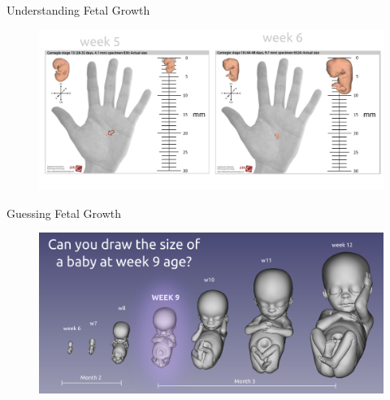 {
\begin{frame}{Understanding Fetal Growth}
      \begin{figure}
        \centering
        \includegraphics[width=1.0\textwidth]{./figures/fetal-size/versions/drawing-v01.png}
      \end{figure}
\end{frame}
}


{
\begin{frame}{Guessing Fetal Growth}
      \begin{figure}
        \centering
        \includegraphics[width=1.0\textwidth]{./figures/fetal-growth/versions/drawing-v02-v01}
      \end{figure}
\end{frame}
}




